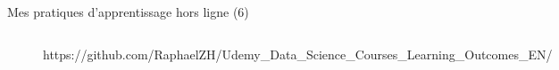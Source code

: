 \documentclass{beamer}
\begin{document}
\begin{frame}[fragile]{Mes pratiques d'apprentissage hors ligne (6)}
\begin{figure}[!htb]
			\endminipage\hfill
			\vspace{.2em}
			\begin{columns}
				\normalfont\footnotesize{https://github.com/RaphaelZH/Udemy\_Data\_Science\_Courses\_Learning\_Outcomes\_EN/}
			\end{columns}
		\end{figure}
	\end{frame}
	
	\backmatter
\end{document}
